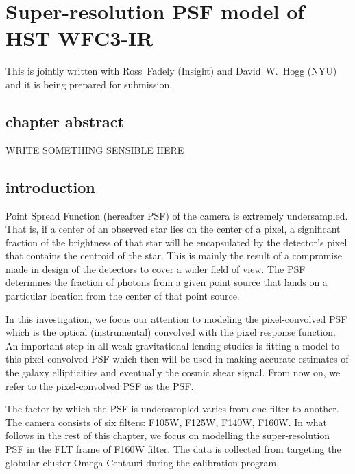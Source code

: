 \chapter{Super-resolution PSF model of HST WFC3-IR}

This \paper is jointly written with Ross~Fadely (Insight) and David~W.~Hogg (NYU) and it is being prepared for submission. 

\section{chapter abstract}

WRITE SOMETHING SENSIBLE HERE

\section{introduction}

Point Spread Function (hereafter PSF) of the \hst \wfc camera is 
extremely undersampled. That is, if a center of an observed star lies on the center of a pixel, a significant fraction of the brightness of that star will be 
encapsulated by the detector's pixel that contains the centroid of the star. 
This is mainly the result of a compromise made in design of the detectors to cover a wider field of view. The PSF determines the fraction of photons from a given point source that lands on a particular location from the center of that point source. 

In this investigation, we focus our attention to modeling the pixel-convolved PSF which is the optical (instrumental) convolved with the pixel response function. An important step in all weak gravitational lensing studies is fitting a model to this pixel-convolved PSF which then will be used in making accurate estimates of the galaxy ellipticities and eventually the cosmic shear signal. 
From now on, we refer to the pixel-convolved PSF as the PSF. 


The factor by which the PSF is undersampled varies from one filter to another.
The \wfc camera consists of six filters: F105W, F125W, F140W, F160W. In what follows in the rest of this chapter, we focus on modelling the super-resolution PSF in the FLT frame of F160W filter. The data is collected from targeting the globular cluster Omega Centauri during the calibration program.

